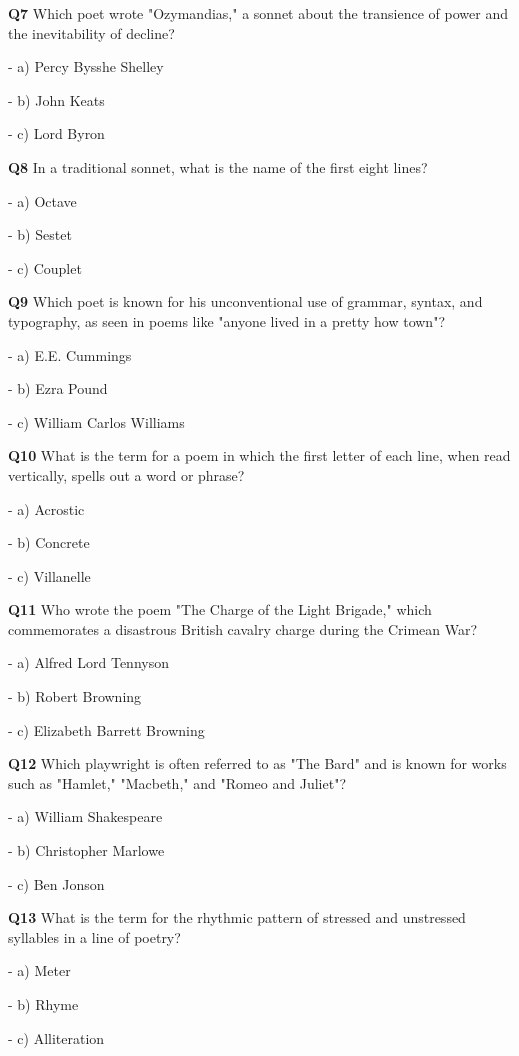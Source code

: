\textbf{Q7} Which poet wrote "Ozymandias," a sonnet about the transience of power and the inevitability of decline?\par
\quad - a) Percy Bysshe Shelley\par
\quad - b) John Keats\par
\quad - c) Lord Byron\par

\textbf{Q8} In a traditional sonnet, what is the name of the first eight lines?\par
\quad - a) Octave\par
\quad - b) Sestet\par
\quad - c) Couplet\par

\textbf{Q9} Which poet is known for his unconventional use of grammar, syntax, and typography, as seen in poems like "anyone lived in a pretty how town"?\par
\quad - a) E.E. Cummings\par
\quad - b) Ezra Pound\par
\quad - c) William Carlos Williams\par

\textbf{Q10} What is the term for a poem in which the first letter of each line, when read vertically, spells out a word or phrase?\par
\quad - a) Acrostic\par
\quad - b) Concrete\par
\quad - c) Villanelle\par

\textbf{Q11} Who wrote the poem "The Charge of the Light Brigade," which commemorates a disastrous British cavalry charge during the Crimean War?\par
\quad - a) Alfred Lord Tennyson\par
\quad - b) Robert Browning\par
\quad - c) Elizabeth Barrett Browning\par

\textbf{Q12} Which playwright is often referred to as "The Bard" and is known for works such as "Hamlet," "Macbeth," and "Romeo and Juliet"?\par
\quad - a) William Shakespeare\par
\quad - b) Christopher Marlowe\par
\quad - c) Ben Jonson\par

\textbf{Q13} What is the term for the rhythmic pattern of stressed and unstressed syllables in a line of poetry?\par
\quad - a) Meter\par
\quad - b) Rhyme\par
\quad - c) Alliteration\par

